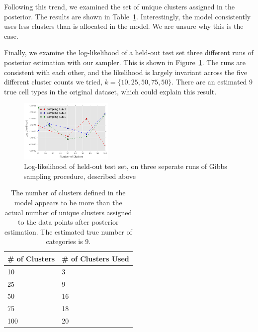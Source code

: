 \documentclass{article}
\begin{document}
Following this trend, we examined the set of unique clusters assigned in the posterior. The results are shown in Table~\ref{mmtable}. Interestingly, the model consistently uses less clusters than is allocated in the model. We are unsure why this is the case.

Finally, we examine the log-likelihood of a held-out test set three different runs of posterior estimation with our sampler. This is shown in Figure~\ref{fig:llmm}. The runs are consistent with each other, and the likelihood is largely invariant across the five different cluster counts we tried, $k=\{10,25,50,75,50\}$. There are an estimated 9 true cell types in the original dataset, which could explain this result.

\begin{figure}[h]
    \centering
    \includegraphics[width=0.4\textwidth]{figs/llmm}
    \caption{Log-likelihood of held-out test set, on three seperate runs of Gibbs sampling procedure, described above}
    \label{fig:llmm}
\end{figure}

\begin{table}[h]
    \centering
    \label{mmtable}
    \begin{tabular}{@{}ll@{}}
        \toprule
        \# of Clusters & \# of Clusters Used \\ \midrule
        10                 & 3                                                         \\
        25                 & 9                                                         \\
        50                 & 16                                                        \\
        75                 & 18                                                        \\
        100                & 20                                                        \\ \bottomrule
    \end{tabular}
    \caption{The number of clusters defined in the model appears to be more than the actual number of unique clusters assigned to the data points after posterior estimation. The estimated true number of categories is 9.}
\end{table}
\end{document}
